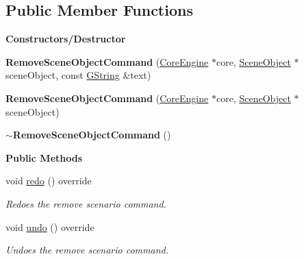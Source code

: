 \subsection*{Public Member Functions}
\begin{Indent}\textbf{ Constructors/\+Destructor}\par
\begin{DoxyCompactItemize}
\item 
\mbox{\label{classrev_1_1_remove_scene_object_command_a4c35495833ada9a9583fe79f98d286c0}} 
{\bfseries Remove\+Scene\+Object\+Command} (\mbox{\hyperlink{classrev_1_1_core_engine}{Core\+Engine}} $\ast$core, \mbox{\hyperlink{classrev_1_1_scene_object}{Scene\+Object}} $\ast$scene\+Object, const \mbox{\hyperlink{classrev_1_1_g_string}{G\+String}} \&text)
\item 
\mbox{\label{classrev_1_1_remove_scene_object_command_aa36ba6aecda96914bed0caf4bdf1827e}} 
{\bfseries Remove\+Scene\+Object\+Command} (\mbox{\hyperlink{classrev_1_1_core_engine}{Core\+Engine}} $\ast$core, \mbox{\hyperlink{classrev_1_1_scene_object}{Scene\+Object}} $\ast$scene\+Object)
\item 
\mbox{\label{classrev_1_1_remove_scene_object_command_ac35ab23d5679435a8f89574960d65589}} 
{\bfseries $\sim$\+Remove\+Scene\+Object\+Command} ()
\end{DoxyCompactItemize}
\end{Indent}
\begin{Indent}\textbf{ Public Methods}\par
\begin{DoxyCompactItemize}
\item 
\mbox{\label{classrev_1_1_remove_scene_object_command_ac62537aa198c51e1cef5771049604f00}} 
void \mbox{\hyperlink{classrev_1_1_remove_scene_object_command_ac62537aa198c51e1cef5771049604f00}{redo}} () override
\begin{DoxyCompactList}\small\item\em Redoes the remove scenario command. \end{DoxyCompactList}\item 
\mbox{\label{classrev_1_1_remove_scene_object_command_a61a1d407e574ea8b697d9dae9835763c}} 
void \mbox{\hyperlink{classrev_1_1_remove_scene_object_command_a61a1d407e574ea8b697d9dae9835763c}{undo}} () override
\begin{DoxyCompactList}\small\item\em Undoes the remove scenario command. \end{DoxyCompactList}\end{DoxyCompactItemize}
\end{Indent}
